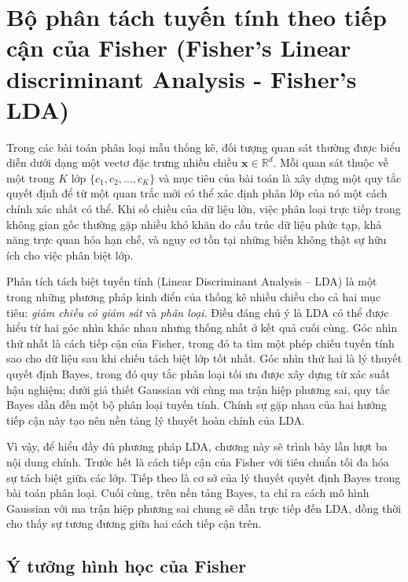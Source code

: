 \section{Bộ phân tách tuyến tính theo tiếp cận của Fisher (Fisher's Linear discriminant Analysis - Fisher's LDA)}

Trong các bài toán phân loại mẫu thống kê, đối tượng quan sát thường được biểu diễn dưới dạng một vectơ đặc trưng nhiều chiều $\bm{x} \in \mathbb{R}^d$. Mỗi quan sát thuộc về một trong $K$ lớp $\{c_1,c_2,\ldots,c_K\}$ và mục tiêu của bài toán là xây dựng một quy tắc quyết định để từ một quan trắc mới có thể xác định phân lớp của nó một cách chính xác nhất có thể. Khi số chiều của dữ liệu lớn, việc phân loại trực tiếp trong không gian gốc thường gặp nhiều khó khăn do cấu trúc dữ liệu phức tạp, khả năng trực quan hóa hạn chế, và nguy cơ tồn tại những biến không thật sự hữu ích cho việc phân biệt lớp.

\hspace*{0.5cm}Phân tích tách biệt tuyến tính (Linear Discriminant Analysis -- LDA) là một trong những phương pháp kinh điển của thống kê nhiều chiều cho cả hai mục tiêu: \emph{giảm chiều có giám sát} và \emph{phân loại}. Điều đáng chú ý là LDA có thể được hiểu từ hai góc nhìn khác nhau nhưng thống nhất ở kết quả cuối cùng. Góc nhìn thứ nhất là cách tiếp cận của Fisher, trong đó ta tìm một phép chiếu tuyến tính sao cho dữ liệu sau khi chiếu tách biệt lớp tốt nhất. Góc nhìn thứ hai là lý thuyết quyết định Bayes, trong đó quy tắc phân loại tối ưu được xây dựng từ xác suất hậu nghiệm; dưới giả thiết Gaussian với cùng ma trận hiệp phương sai, quy tắc Bayes dẫn đến một bộ phân loại tuyến tính. Chính sự gặp nhau của hai hướng tiếp cận này tạo nên nền tảng lý thuyết hoàn chỉnh của LDA.

\hspace*{0.5cm}Vì vậy, để hiểu đầy đủ phương pháp LDA, chương này sẽ trình bày lần lượt ba nội dung chính. Trước hết là cách tiếp cận của Fisher với tiêu chuẩn tối đa hóa sự tách biệt giữa các lớp. Tiếp theo là cơ sở của lý thuyết quyết định Bayes trong bài toán phân loại. Cuối cùng, trên nền tảng Bayes, ta chỉ ra cách mô hình Gaussian với ma trận hiệp phương sai chung sẽ dẫn trực tiếp đến LDA, đồng thời cho thấy sự tương đương giữa hai cách tiếp cận trên.

\subsection{Ý tưởng hình học của Fisher}

